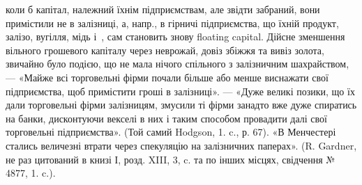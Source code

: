 \parcont{}  %
коли б капітал, належний їхнім підприємствам, але звідти забраний, вони примістили
не в залізниці, а, напр., в гірничі підприємства, що їхній продукт,
залізо, вугілля, мідь і~, сам становить знову floating capital. Дійсне зменшення
вільного грошевого капіталу через неврожай, довіз збіжжя та вивіз
золота, звичайно було подією, що не мала нічого спільного з залізничним
шахрайством, — «Майже всі торговельні фірми почали більше або менше виснажати
свої підприємства, щоб примістити гроші в залізниці». — «Дуже великі позики,
що їх дали торговельні фірми залізницям, змусили ті фірми занадто вже дуже
спиратись на банки, дисконтуючи векселі в них і таким способом провадити
далі свої торговельні підприємства». (Той самий Hodgson, 1. c., р. 67). «В Менчестері
стались величезні втрати через спекуляцію на залізничних паперах».
(R. Gardner, не раз цитований в книзі І, розд. XIII, 3, c. та по інших місцях,
свідчення № 4877, 1. c.).

